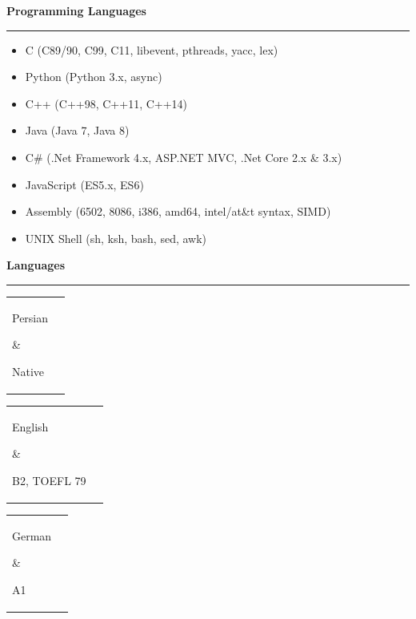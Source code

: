 \documentclass[11pt,a4paper,oneside]{article}
\makeatletter
\renewcommand{\section}[1]{%
{\large\textbf{#1}}\\
\rule[9pt]{18cm}{.4pt}\vspace{-15pt}%
}
\newenvironment{mytable}{%
\begin{tabular}{@{}l@{\hspace{4mm}}l@{}}%
}{\end{tabular}}
\newcommand{\myitem}[2]{%
\parbox[t]{16mm}{#1}&\parbox[t]{16cm}{#2}\\%
}
\makeatother
\begin{document}
\section{Programming Languages}
\begin{itemize}
\item C (C89/90, C99, C11, libevent, pthreads, yacc, lex)
\item Python (Python 3.x, async)
\item C++ (C++98, C++11, C++14)
\item Java (Java 7, Java 8)
\item C\# (.Net Framework 4.x, ASP.NET MVC, .Net Core 2.x \& 3.x)
\item JavaScript (ES5.x, ES6)
\item Assembly (6502, 8086, i386, amd64, intel/at\&t syntax, SIMD)
\item UNIX Shell (sh, ksh, bash, sed, awk)
\end{itemize}

\section{Languages}

\begin{mytable}\myitem{Persian}{
	Native
}\end{mytable}

\begin{mytable}\myitem{English}{
	B2, TOEFL 79
}\end{mytable}

\begin{mytable}\myitem{German}{
	A1
}\end{mytable}
\end{document}
